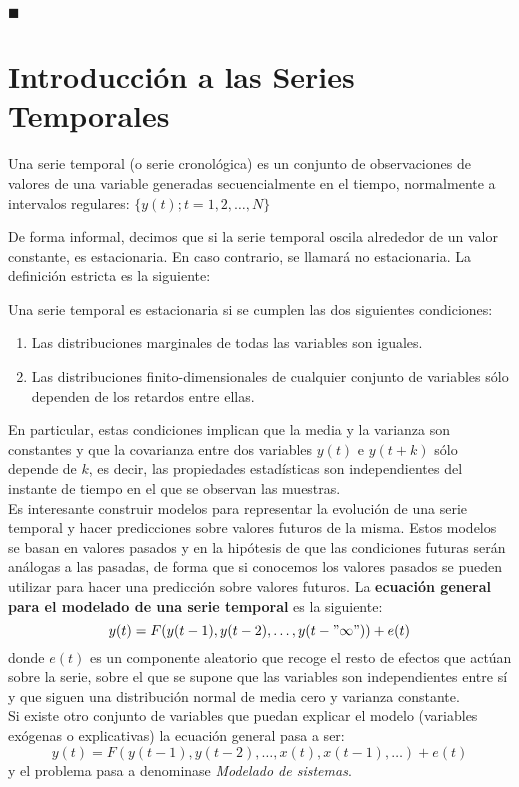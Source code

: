 \begin{flushright}
$\blacksquare$
\end{flushright}

\section{Introducción a las Series Temporales}

\begin{definicion}
Una serie temporal (o serie cronológica) es un conjunto de observaciones de valores de una variable generadas secuencialmente en el tiempo, normalmente a intervalos regulares: $\{y(t); t=1,2,\dots, N\}$
\end{definicion}

De forma informal, decimos que si la serie temporal oscila alrededor de un valor constante, es estacionaria. En caso contrario, se llamará no estacionaria. La definición estricta es la siguiente:
\begin{definicion}
Una serie temporal es estacionaria si se cumplen las dos siguientes condiciones:
\begin{enumerate}
\item Las distribuciones marginales de todas las variables son iguales.
\item Las distribuciones finito-dimensionales de cualquier conjunto de variables sólo dependen de los retardos entre ellas.
\end{enumerate}
\end{definicion}
En particular, estas condiciones implican que la media y la varianza son constantes y que la covarianza entre dos variables $y(t)$ e $y(t+k)$ sólo depende de $k$, es decir, las propiedades estadísticas son independientes del instante de tiempo en el que se observan las muestras.\\


Es interesante construir modelos para representar la evolución de una serie temporal y hacer predicciones sobre valores futuros de la misma. Estos modelos se basan en valores pasados y en la hipótesis de que las condiciones futuras serán análogas a las pasadas, de forma que si conocemos los valores pasados se pueden utilizar para hacer una predicción sobre valores futuros. La \textbf{ecuación general para el modelado de una serie temporal} es la siguiente:
\[	y(t) = F(y(t-1), y(t-2), \dots, y(t-"\infty ")) + e(t)	\]
donde $e(t)$ es un componente aleatorio que recoge el resto de efectos que actúan sobre la serie, sobre el que se supone que las variables son independientes entre sí y que siguen una distribución normal de media cero y varianza constante.\\
Si existe otro conjunto de variables que puedan explicar el modelo (variables exógenas o explicativas) la ecuación general pasa a ser:
\[	y(t) = F(y(t-1), y(t-2), \dots, x(t), x(t-1), \dots) + e(t)	\]
y el problema pasa a denominase \textit{Modelado de sistemas}.\\

